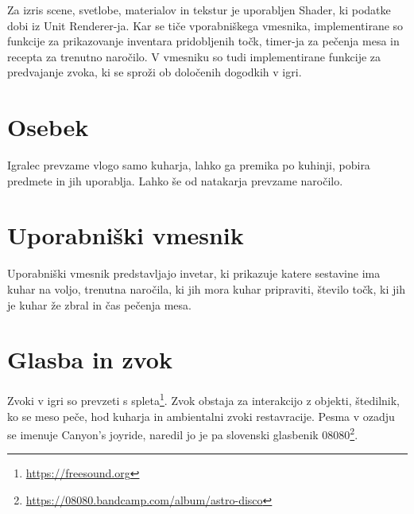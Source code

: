 \documentclass[a4paper]{article}
\begin{document}
Za izris scene, svetlobe, materialov in tekstur je uporabljen Shader, ki podatke dobi iz Unit Renderer-ja. Kar se tiče vporabniškega vmesnika, implementirane so funkcije za prikazovanje inventara pridobljenih točk,
timer-ja za pečenja mesa in recepta za trenutno naročilo. V vmesniku so tudi implementirane funkcije za predvajanje zvoka, ki se sproži ob določenih dogodkih v igri.

\section{Osebek}
Igralec prevzame vlogo samo kuharja, lahko ga premika po kuhinji, pobira predmete in jih uporablja. Lahko še od natakarja prevzame naročilo.

\section{Uporabniški vmesnik}
Uporabniški vmesnik predstavljajo invetar, ki prikazuje katere sestavine ima kuhar na voljo, trenutna naročila, ki jih mora kuhar pripraviti, število točk, ki jih je kuhar že zbral in čas pečenja mesa.

\section{Glasba in zvok}
Zvoki v igri so prevzeti s spleta\footnote{\url{https://freesound.org}}. Zvok obstaja za interakcijo z objekti, štedilnik, ko se meso peče, hod kuharja in ambientalni zvoki restavracije.
Pesma v ozadju se imenuje Canyon's joyride, naredil jo je pa slovenski glasbenik 08080\footnote{\url{https://08080.bandcamp.com/album/astro-disco}}.
\end{document}
